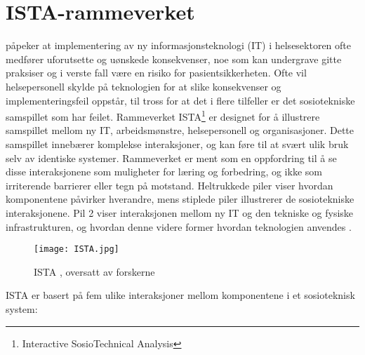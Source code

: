 \section{ISTA-rammeverket}
\label{section:ista-rammeverket}

\citet{Harrison} påpeker at implementering av ny informasjonsteknologi (IT) i helsesektoren ofte medfører uforutsette og uønskede konsekvenser, noe som kan undergrave gitte praksiser og i verste fall være en risiko for pasientsikkerheten. Ofte vil helsepersonell skylde på teknologien for at slike konsekvenser og implementeringsfeil oppstår, til tross for at det i flere tilfeller er det sosiotekniske samspillet som har feilet. Rammeverket ISTA\footnote{Interactive SosioTechnical Analysis} er designet for å illustrere samspillet mellom ny IT, arbeidsmønstre, helsepersonell og organisasjoner. Dette samspillet innebærer komplekse interaksjoner, og kan føre til at svært ulik bruk selv av identiske systemer. Rammeverket er ment som en oppfordring til å se disse interaksjonene som muligheter for læring og forbedring, og ikke som irriterende barrierer eller tegn på motstand. Heltrukkede piler viser hvordan komponentene påvirker hverandre, mens stiplede piler illustrerer de sosiotekniske interaksjonene. Pil 2 viser interaksjonen mellom ny IT og den tekniske og fysiske infrastrukturen, og hvordan denne videre former hvordan teknologien anvendes \citep{Harrison}.

\begin{figure}[H]
\centering
\texttt{[image: ISTA.jpg]}
\caption{ISTA \citep{Harrison}, oversatt av forskerne}
\label{fig:ISTA}
\end{figure}

\noindent
ISTA er basert på fem ulike interaksjoner mellom komponentene i et sosioteknisk system:  

